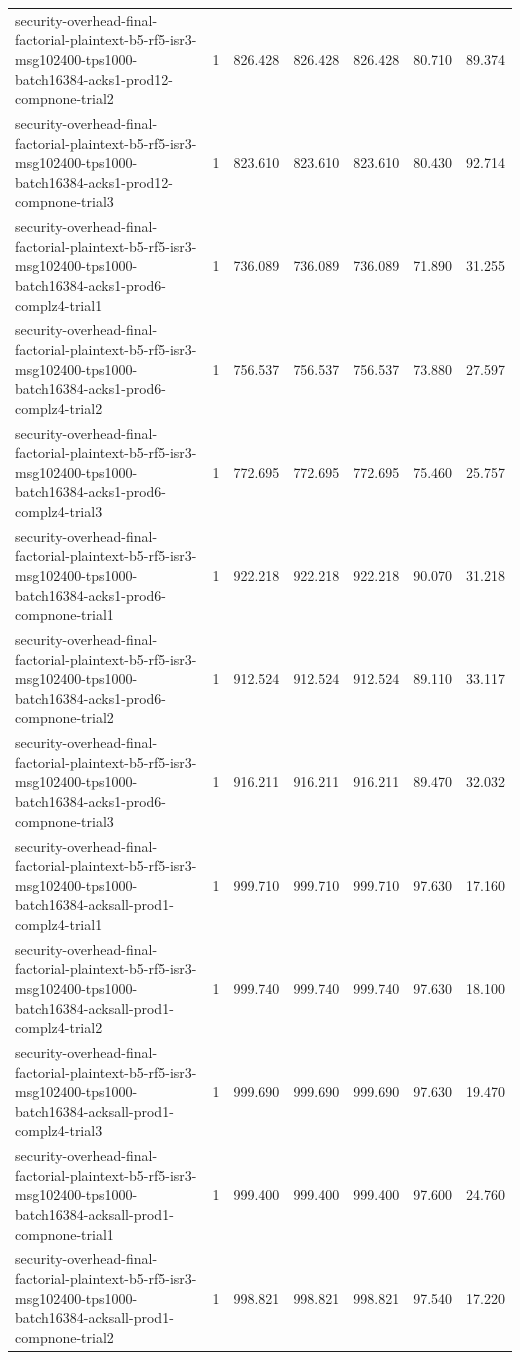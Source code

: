 \begin{tabular}{lrrrrrr}
security-overhead-final-factorial-plaintext-b5-rf5-isr3-msg102400-tps1000-batch16384-acks1-prod12-compnone-trial2 & 1 & 826.428 & 826.428 & 826.428 & 80.710 & 89.374 \\
security-overhead-final-factorial-plaintext-b5-rf5-isr3-msg102400-tps1000-batch16384-acks1-prod12-compnone-trial3 & 1 & 823.610 & 823.610 & 823.610 & 80.430 & 92.714 \\
security-overhead-final-factorial-plaintext-b5-rf5-isr3-msg102400-tps1000-batch16384-acks1-prod6-complz4-trial1 & 1 & 736.089 & 736.089 & 736.089 & 71.890 & 31.255 \\
security-overhead-final-factorial-plaintext-b5-rf5-isr3-msg102400-tps1000-batch16384-acks1-prod6-complz4-trial2 & 1 & 756.537 & 756.537 & 756.537 & 73.880 & 27.597 \\
security-overhead-final-factorial-plaintext-b5-rf5-isr3-msg102400-tps1000-batch16384-acks1-prod6-complz4-trial3 & 1 & 772.695 & 772.695 & 772.695 & 75.460 & 25.757 \\
security-overhead-final-factorial-plaintext-b5-rf5-isr3-msg102400-tps1000-batch16384-acks1-prod6-compnone-trial1 & 1 & 922.218 & 922.218 & 922.218 & 90.070 & 31.218 \\
security-overhead-final-factorial-plaintext-b5-rf5-isr3-msg102400-tps1000-batch16384-acks1-prod6-compnone-trial2 & 1 & 912.524 & 912.524 & 912.524 & 89.110 & 33.117 \\
security-overhead-final-factorial-plaintext-b5-rf5-isr3-msg102400-tps1000-batch16384-acks1-prod6-compnone-trial3 & 1 & 916.211 & 916.211 & 916.211 & 89.470 & 32.032 \\
security-overhead-final-factorial-plaintext-b5-rf5-isr3-msg102400-tps1000-batch16384-acksall-prod1-complz4-trial1 & 1 & 999.710 & 999.710 & 999.710 & 97.630 & 17.160 \\
security-overhead-final-factorial-plaintext-b5-rf5-isr3-msg102400-tps1000-batch16384-acksall-prod1-complz4-trial2 & 1 & 999.740 & 999.740 & 999.740 & 97.630 & 18.100 \\
security-overhead-final-factorial-plaintext-b5-rf5-isr3-msg102400-tps1000-batch16384-acksall-prod1-complz4-trial3 & 1 & 999.690 & 999.690 & 999.690 & 97.630 & 19.470 \\
security-overhead-final-factorial-plaintext-b5-rf5-isr3-msg102400-tps1000-batch16384-acksall-prod1-compnone-trial1 & 1 & 999.400 & 999.400 & 999.400 & 97.600 & 24.760 \\
security-overhead-final-factorial-plaintext-b5-rf5-isr3-msg102400-tps1000-batch16384-acksall-prod1-compnone-trial2 & 1 & 998.821 & 998.821 & 998.821 & 97.540 & 17.220 \\

\end{tabular}
